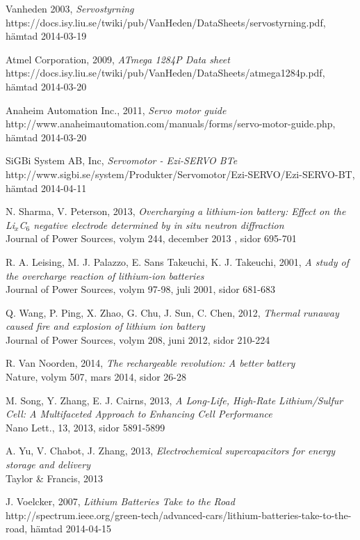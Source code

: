 \documentclass[a4paper,12pt]{article}
\begin{document}
\begin{thebibliography}{9}
 Vanheden 2003, \emph{Servostyrning}
\\https://docs.isy.liu.se/twiki/pub/VanHeden/DataSheets/servostyrning.pdf, hämtad 2014-03-19

 Atmel Corporation, 2009, \emph{ATmega 1284P Data sheet}
\\https://docs.isy.liu.se/twiki/pub/VanHeden/DataSheets/atmega1284p.pdf, hämtad 2014-03-20

 Anaheim Automation Inc., 2011, \emph{Servo motor guide}
\\ http://www.anaheimautomation.com/manuals/forms/servo-motor-guide.php, hämtad 2014-03-20

 SiGBi System AB, Inc, \emph{Servomotor - Ezi-SERVO BTe}\\
http://www.sigbi.se/system/Produkter/Servomotor/Ezi-SERVO/Ezi-SERVO-BT, hämtad 2014-04-11

 N. Sharma, V. Peterson, 2013, \emph{Overcharging a lithium-ion battery: Effect on the Li$_{x}$C$_{6}$ negative electrode determined by in situ neutron diffraction}
\\ Journal of Power Sources, volym 244, december 2013 , sidor 695-701

 R. A. Leising, M. J. Palazzo, E. Sans Takeuchi, K. J. Takeuchi, 2001, \emph{A study of the overcharge reaction of lithium-ion batteries}
\\ Journal of Power Sources, volym 97-98, juli 2001, sidor 681-683

 Q. Wang, P. Ping, X. Zhao, G. Chu, J. Sun, C. Chen, 2012, \emph{Thermal runaway caused fire and explosion of lithium ion battery}
\\ Journal of Power Sources, volym 208, juni 2012, sidor 210-224

 R. Van Noorden, 2014, \emph{The rechargeable revolution: A better battery} \\ Nature, volym 507, mars 2014, sidor 26-28

 M. Song, Y. Zhang, E. J. Cairns, 2013, \emph{A Long-Life, High-Rate Lithium/Sulfur Cell: A Multifaceted Approach to Enhancing Cell Performance} \\ Nano Lett., 13, 2013, sidor 5891-5899

 A. Yu, V. Chabot, J. Zhang, 2013, \emph{Electrochemical supercapacitors for energy storage and delivery} \\ Taylor \& Francis, 2013

 J. Voelcker, 2007, \emph{Lithium Batteries Take to the Road} \\
http://spectrum.ieee.org/green-tech/advanced-cars/lithium-batteries-take-to-the-road, hämtad 2014-04-15

\end{thebibliography}
\end{document}
